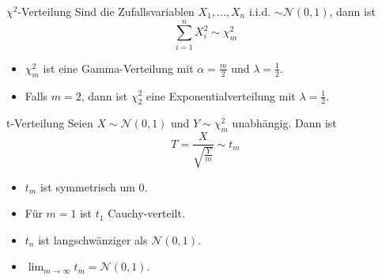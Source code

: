 \begin{subbox}{$\chi^2$-Verteilung}
	Sind die Zufallsvariablen $X_1, ..., X_n$ i.i.d. $\sim \mathcal{N}(0,1)$, dann ist
	\[\sum_{i = 1}^n X_i^2 \sim \chi^2_m\]

	\begin{itemize}
		\item $\chi^2_m$ ist eine Gamma-Verteilung mit $\alpha = \frac{m}{2}$ und $\lambda = \frac{1}{2}$.
		\item Falls $m = 2$, dann ist $\chi^2_2$ eine Exponentialverteilung mit $\lambda = \frac{1}{2}$.
	\end{itemize}
\end{subbox}

\begin{subbox}{t-Verteilung}
	Seien $X \sim \mathcal{N}(0,1)$ und $Y \sim \chi^2_m$ unabhängig. Dann ist
	\[T = \frac{X}{\sqrt{\frac{Y}{m}}} \sim t_m\]

	\begin{itemize}
		\item $t_m$ ist symmetrisch um $0$.
		\item Für $m = 1$ ist $t_1$ Cauchy-verteilt.
		\item $t_n$ ist langschwänziger als $\mathcal{N}(0,1)$.
		\item $\lim_{m\to\infty} t_m = \mathcal{N}(0,1)$.
	\end{itemize}
\end{subbox}

